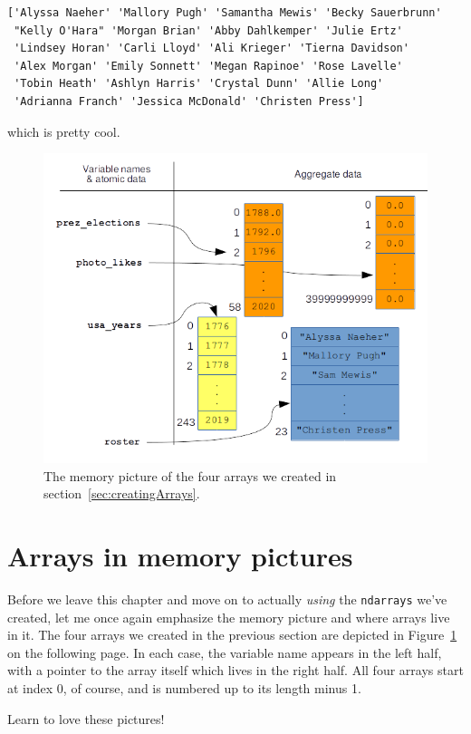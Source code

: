 \label{rosterNames}
\begin{Verbatim}[fontsize=\small,samepage=true,frame=leftline,framesep=5mm,framerule=1mm]
['Alyssa Naeher' 'Mallory Pugh' 'Samantha Mewis' 'Becky Sauerbrunn'
 "Kelly O'Hara" 'Morgan Brian' 'Abby Dahlkemper' 'Julie Ertz'
 'Lindsey Horan' 'Carli Lloyd' 'Ali Krieger' 'Tierna Davidson'
 'Alex Morgan' 'Emily Sonnett' 'Megan Rapinoe' 'Rose Lavelle'
 'Tobin Heath' 'Ashlyn Harris' 'Crystal Dunn' 'Allie Long'
 'Adrianna Franch' 'Jessica McDonald' 'Christen Press']
\end{Verbatim}

which is pretty cool.

\begin{figure}[ht]
\centering
\includegraphics[width=1\textwidth]{arraysInMemory.png}
\caption{The memory picture of the four arrays we created in
section~\ref{sec:creatingArrays}.}
\label{fig:arraysInMemory}
\end{figure}
\section{Arrays in memory pictures}


Before we leave this chapter and move on to actually \textit{using} the
\texttt{ndarrays} we've created, let me once again emphasize the memory picture
and where arrays live in it. The four arrays we created in the previous section
are depicted in Figure~\ref{fig:arraysInMemory} on the following page. In each
case, the variable name appears in the left half, with a pointer to the array
itself which lives in the right half. All four arrays start at index 0, of
course, and is numbered up to its length minus 1.

Learn to love these pictures!
